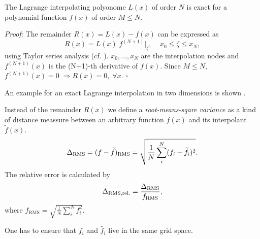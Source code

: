 The Lagrange interpolating polyonome $L(x)$ of order $N$ is exact for a
polynomial function $f(x)$ of order $M \le N$.

\emph{Proof:} The remainder $R(x) = L(x) - f(x)$ can be expressed as
\begin{equation}
    R(x) = L(x) \; f^{(N+1)}|_{\zeta}, \;\;\;\; x_0 \le \zeta \le x_N,
\end{equation}
using Taylor series analysis (cf. \cite[p. 878]{abramowitz1964handbook}).
$x_0,...,x_N$ are the interpolation nodes and $f^{(N+1)}(x)$ is the (N+1)-th
derivative of $f(x)$.  Since $M \le N$, $f^{(N+1)}(x) = 0 \; \Rightarrow R(x) =
0,\; \forall x$. $\square$

An example for an exact Lagrange interpolation in two dimensions is shown
.

Instead of the remainder $R(x)$ we define a \emph{root-means-sqare
variance} as a kind of distance meassure between an arbitrary function $f(x)$ and
its interpolant $\widetilde{f}(x)$.
\begin{equation}
\label{eqn:error-rms}
    \Delta_{\text{RMS}} = (f - \widetilde{f})_{\text{RMS}} = \sqrt{\frac{1}{N} \sum^N_i (f_i - \widetilde{f_i})^2}.
\end{equation}
The relative error is calculated by
\begin{equation}
    \Delta_{\text{RMS,rel.}} = \frac{\Delta_{\text{RMS}}}{f_{\text{RMS}}},
\end{equation}
where $f_{\text{RMS}} = \sqrt{\frac{1}{N} \sum^N_i f^2_i}$. 

\remark One has to ensure that $f_i$ and $\widetilde{f_i}$ live in the same grid space.

% 
% 

